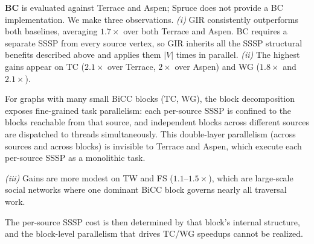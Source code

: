 \textbf{BC} is evaluated against Terrace and Aspen; Spruce does not provide a BC implementation.
We make three observations.
\textit{(i)} GIR consistently outperforms both baselines, averaging $1.7\times$ over both Terrace and Aspen.
BC requires a separate SSSP from every source vertex, so GIR inherits all the SSSP structural benefits described above and applies them $|V|$ times in parallel.
\textit{(ii)} The highest gains appear on TC ($2.1\times$ over Terrace, $2\times$ over Aspen) and WG ($1.8\times$ and $2.1\times$).
\begin{maybecut}
For graphs with many small BiCC blocks (TC, WG), the block decomposition exposes fine-grained task parallelism: each per-source SSSP is confined to the blocks reachable from that source, and independent blocks across different sources are dispatched to threads simultaneously.
This double-layer parallelism (across sources and across blocks) is invisible to Terrace and Aspen, which execute each per-source SSSP as a monolithic task.
\end{maybecut}
\textit{(iii)} Gains are more modest on TW and FS ($1.1$--$1.5\times$), which are large-scale social networks where one dominant BiCC block governs nearly all traversal work.
\begin{maybecut}
The per-source SSSP cost is then determined by that block's internal structure, and the block-level parallelism that drives TC/WG speedups cannot be realized.
\end{maybecut}









